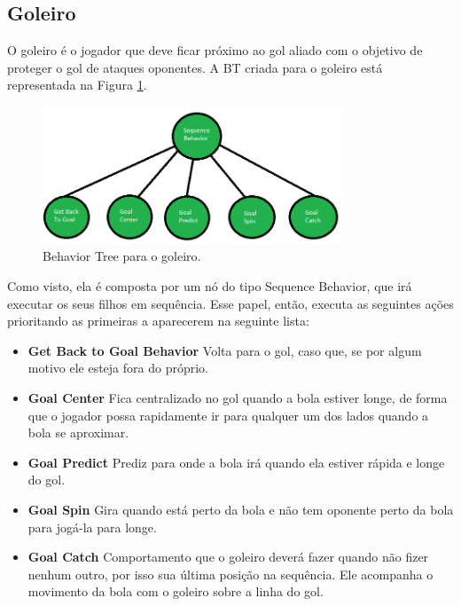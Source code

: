 \documentclass[10pt,fleqn,a4paper]{article}
\begin{document}
\subsection{Goleiro}

O goleiro é o jogador que deve ficar próximo ao gol aliado com o objetivo de proteger o gol de ataques oponentes. 
A BT criada para o goleiro está representada na Figura \ref{fig:goalier_bt}.

\begin{figure}[H]
	\centering
	\includegraphics[width=0.8\textwidth]{figures/Goalier_BT.png}
   	\caption{Behavior Tree para o goleiro.} \label{fig:goalier_bt}
\end{figure}

Como visto, ela é composta por um nó do tipo Sequence Behavior, que irá executar os seus filhos em sequência. Esse papel, então, executa as seguintes ações prioritando as primeiras a aparecerem na seguinte lista:

\begin{itemize}

\item \textbf{Get Back to Goal Behavior} Volta para o gol, caso que, se por algum motivo ele esteja fora do próprio.

\item \textbf{Goal Center} Fica centralizado no gol quando a bola estiver longe, de forma que o jogador possa rapidamente ir para qualquer um dos lados quando a bola se aproximar.

\item \textbf{Goal Predict} Prediz para onde a bola irá quando ela estiver rápida e longe do gol.

\item \textbf{Goal Spin} Gira quando está perto da bola e não tem oponente perto da bola para jogá-la para longe.

\item \textbf{Goal Catch} Comportamento que o goleiro deverá fazer quando não fizer nenhum outro, por isso sua última posição na sequência. Ele acompanha o movimento da bola com o goleiro sobre a linha do gol.

\end{itemize}
\end{document}
